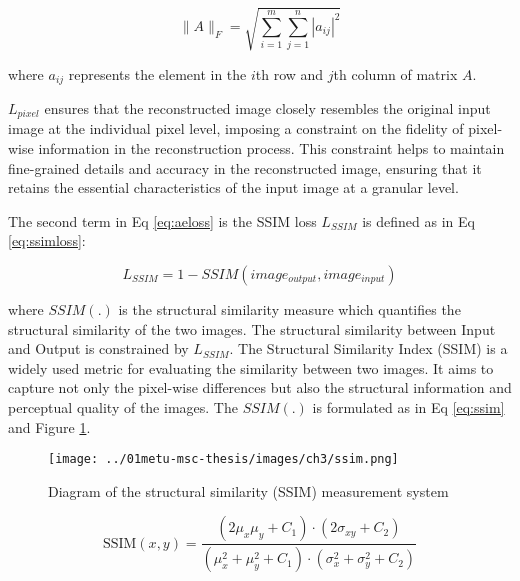 \begin{equation}\label{eq:Frobenius}
    \|A\|_F = \sqrt{\sum_{i=1}^{m} \sum_{j=1}^{n} |a_{ij}|^2}
\end{equation}

where $a_{ij}$ represents the element in the $i$th row and $j$th column of matrix $A$.

$L_{pixel}$ ensures that the reconstructed image closely resembles the original input image at the individual pixel level, imposing a constraint on the fidelity of pixel-wise information in the reconstruction process. This constraint helps to maintain fine-grained details and accuracy in the reconstructed image, ensuring that it retains the essential characteristics of the input image at a granular level. 

The second term in Eq \ref{eq:aeloss} is the SSIM loss $L_{SSIM}$ is defined as in Eq \ref{eq:ssimloss}:

\begin{equation}\label{eq:ssimloss}
    L_{SSIM} = 1- SSIM(image_{output},image_{input})
\end{equation}

where $SSIM(.)$ is the structural similarity measure \cite{ma2015perceptual} which quantifies the structural similarity of the two images. The structural similarity between Input and Output is constrained by
$L_{SSIM}$. The Structural Similarity Index (SSIM) is a widely used metric for evaluating the similarity between two images. It aims to capture not only the pixel-wise differences but also the structural information and perceptual quality of the images. The $SSIM(.)$ is formulated as in Eq \ref{eq:ssim} and Figure \ref{fig:ch3:ssim}.

\begin{figure}[htbp]
    \centering
    \texttt{[image: ../01metu-msc-thesis/images/ch3/ssim.png]}
    \caption{Diagram of the structural similarity (SSIM) measurement system \cite{ma2015perceptual}}
    \label{fig:ch3:ssim}
\end{figure}

\begin{equation}\label{eq:ssim}
\text{SSIM}(x, y) = \frac{{(2\mu_x\mu_y + C_1) \cdot (2\sigma_{xy} + C_2)}}{{(\mu_x^2 + \mu_y^2 + C_1) \cdot (\sigma_x^2 + \sigma_y^2 + C_2)}}
\end{equation}

